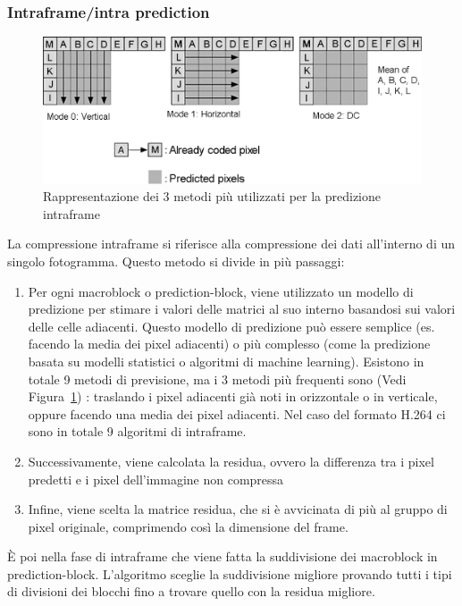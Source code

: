\documentclass[a4paper,12pt, oneside]{article}
\begin{document}
\subsubsection{Intraframe/intra prediction}
\begin{figure}[h]
    \centering
    \includegraphics[width=1\textwidth]{images/intraframe-algo.png}
    \caption{Rappresentazione dei 3 metodi più utilizzati per la predizione intraframe}
    \label{fig:intraframe_algo}
\end{figure}

\noindent La compressione intraframe si riferisce alla compressione dei dati all'interno di
un singolo fotogramma. Questo metodo si divide in più passaggi:
\begin{enumerate}
  \item Per ogni macroblock o prediction-block, viene utilizzato un modello di predizione per stimare
  i valori delle matrici al suo interno basandosi sui valori delle celle adiacenti. Questo modello di
  predizione può essere semplice (es. facendo la media dei pixel adiacenti) o più complesso (come la
  predizione basata su modelli statistici o algoritmi di machine learning). Esistono in totale 9 metodi
  di previsione, ma i 3 metodi più frequenti sono (Vedi Figura~\ref{fig:intraframe_algo}) : traslando
  i pixel adiacenti già noti in orizzontale o in verticale, oppure facendo una media dei pixel adiacenti. Nel
  caso del formato H.264 ci sono in totale 9 algoritmi di intraframe.
  \item Successivamente, viene calcolata la residua, ovvero la differenza tra i pixel predetti e i
  pixel dell'immagine non compressa
  \item Infine, viene scelta la matrice residua, che si è avvicinata di più al gruppo di pixel originale,
  comprimendo così la dimensione del frame.
\end{enumerate}
È poi nella fase di intraframe che viene fatta la suddivisione dei macroblock in prediction-block.
L'algoritmo sceglie la suddivisione migliore provando tutti i tipi di divisioni dei
blocchi fino a trovare quello con la residua migliore.
\end{document}
